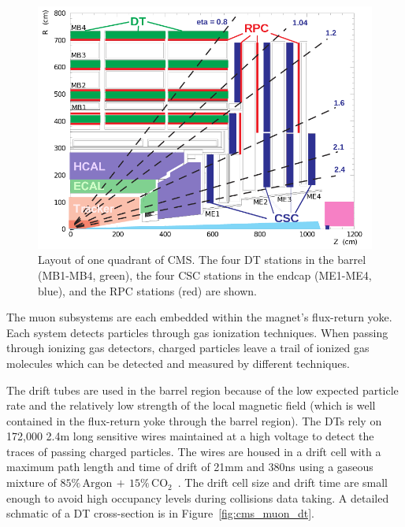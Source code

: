 \begin{figure}[htbp]
\centering
     \includegraphics[width=1.0\textwidth]{cms_and_lhc/plots/cms_muon_syst.png}
     \caption{
Layout of one quadrant of CMS. The four DT stations in the barrel (MB1-MB4, green), the four CSC stations in the endcap (ME1-ME4, blue), and the RPC stations (red) are shown.
     }
     \label{fig:cms_muon_syst}
\end{figure}

The muon subsystems are each embedded within the magnet's flux-return yoke. Each system
detects particles through gas ionization techniques. 
When passing through ionizing gas detectors, charged particles leave a trail of ionized gas 
molecules which can be detected and measured by different techniques.

The drift tubes are used in the barrel region
because of the low expected particle rate and the relatively low strength of the local
magnetic field (which is well contained in the flux-return yoke through the barrel region).
The DTs rely on 172,000 2.4m long sensitive wires maintained at a high voltage to detect the traces
of passing charged particles. The wires are housed in a drift cell with a maximum path length
and time of drift of 21mm and 380ns using a gaseous mixture of 
$85\% \, \textrm{Argon} \, + \, 15\% \, \textrm{CO}_{2}$~\cite{CMS-Proposal}. The drift cell size and drift
time are small enough to avoid high occupancy levels during collisions data taking.
A detailed schmatic of a DT cross-section is in Figure~\ref{fig:cms_muon_dt}.

